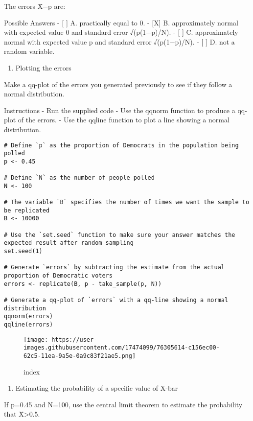 \documentclass[
]{article}
\providecommand{\tightlist}{%
  \setlength{\itemsep}{0pt}\setlength{\parskip}{0pt}}
\begin{document}
The errors X̄−p are:

Possible Answers - {[} {]} A. practically equal to 0. - {[}X{]} B.
approximately normal with expected value 0 and standard error
√(p(1−p)/N). - {[} {]} C. approximately normal with expected value p and
standard error √(p(1−p)/N). - {[} {]} D. not a random variable.

\begin{enumerate}
\def\labelenumi{\arabic{enumi}.}
\setcounter{enumi}{10}
\tightlist
\item
  Plotting the errors
\end{enumerate}

Make a qq-plot of the errors you generated previously to see if they
follow a normal distribution.

Instructions - Run the supplied code - Use the qqnorm function to
produce a qq-plot of the errors. - Use the qqline function to plot a
line showing a normal distribution.

\begin{verbatim}
# Define `p` as the proportion of Democrats in the population being polled
p <- 0.45

# Define `N` as the number of people polled
N <- 100

# The variable `B` specifies the number of times we want the sample to be replicated
B <- 10000

# Use the `set.seed` function to make sure your answer matches the expected result after random sampling
set.seed(1)

# Generate `errors` by subtracting the estimate from the actual proportion of Democratic voters
errors <- replicate(B, p - take_sample(p, N))

# Generate a qq-plot of `errors` with a qq-line showing a normal distribution
qqnorm(errors)
qqline(errors)
\end{verbatim}

\begin{figure}
\centering
\texttt{[image: https://user-images.githubusercontent.com/17474099/76305614-c156ec00-62c5-11ea-9a5e-0a9c83f21ae5.png]}
\caption{index}
\end{figure}

\begin{enumerate}
\def\labelenumi{\arabic{enumi}.}
\setcounter{enumi}{11}
\tightlist
\item
  Estimating the probability of a specific value of X-bar
\end{enumerate}

If p=0.45 and N=100, use the central limit theorem to estimate the
probability that X̄\textgreater0.5.
\end{document}
